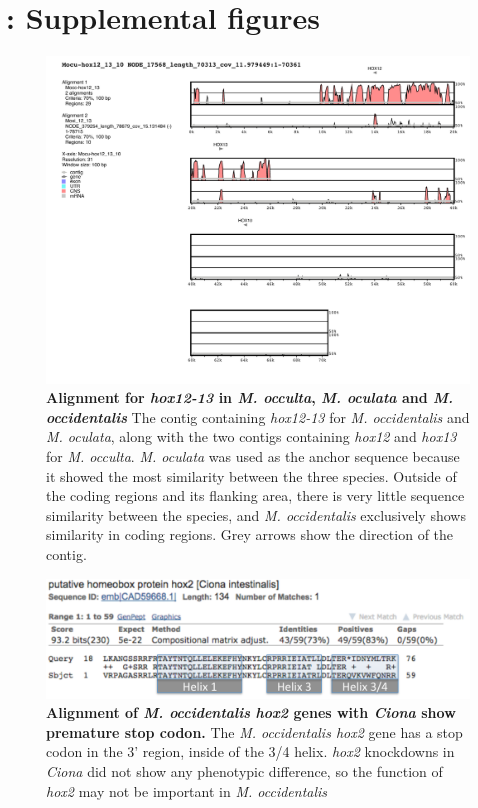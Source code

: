 \chapter{: Supplemental figures}
\begin{figure}[tbp]
\centering
\includegraphics[scale=0.6]{figures/Hox12_13.pdf}
\caption{\textbf{Alignment for \textit{hox12-13} in \textit{M. occulta}, \textit{M. oculata} and \textit{M. occidentalis}} The contig containing \textit{hox12-13} for \textit{M. occidentalis} and \textit{M. oculata}, along with the two contigs containing \textit{hox12} and \textit{hox13} for \textit{M. occulta}. \textit{M. oculata} was used as the anchor sequence because it showed the most similarity between the three species. Outside of the coding regions and its flanking area, there is very little sequence similarity between the species, and \textit{M. occidentalis} exclusively shows similarity in coding regions. Grey arrows show the direction of the contig.}
\label{fig:hox12}
\end{figure}

\begin{figure}[thbp]
\centering
\includegraphics[scale=0.75]{figures/occi_hox2.pdf}
\caption{\textbf{Alignment of \textit{M. occidentalis} \textit{hox2} genes with \textit{Ciona} show  premature stop codon.} The \textit{M. occidentalis hox2} gene has a stop codon in the 3' region, inside of the 3/4 helix. \textit{hox2} knockdowns in \textit{Ciona} did not show any phenotypic difference, so the function of \textit{hox2} may not be important in \textit{M. occidentalis} }
\label{fig:occihox2}
\end{figure}

